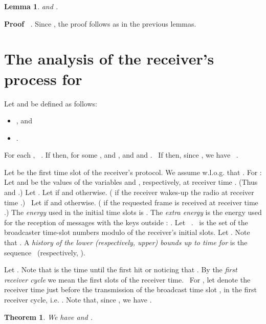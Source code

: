 \documentclass{article}
\newcommand{\tmem}[1]{{\em #1\/}}
\newcommand{\tmtextbf}[1]{{\bfseries{#1}}}
\newenvironment{itemizedot}{\begin{itemize} \renewcommand{\labelitemi}{}\renewcommand{\labelitemii}{}\renewcommand{\labelitemiii}{}\renewcommand{\labelitemiv}{}}{\end{itemize}}
\newenvironment{proof}{\noindent\textbf{Proof\ }}{\hspace*{\fill}\medskip}
\newtheorem{lemma}{Lemma}
\newtheorem{theorem}{Theorem}
\begin{document}
\begin{lemma}
  \label{union-X-Lemma} and
  .
\end{lemma}

\begin{proof}
  . Since , the
  proof follows as in the previous lemmas. 
\end{proof}

\section{\label{Section-analysis}\tmtextbf{The analysis of the receiver's
process for }}

Let  and  be defined as follows:
\begin{itemizedot}
  \item , and
  
  \item .
\end{itemizedot}
For each , \ . If  then, for some ,
 and , and  and
. \ If  then,
since , we have \ .

Let  be the first time slot of the receiver's protocol. We assume w.l.o.g.
that . For : Let  and 
be the values of the variables  and , respectively, at
receiver time . (Thus  and .) Let
. Let  if
 and  otherwise.
( if the receiver wakes-up the radio at receiver time .)
\ Let  if  and 
otherwise. ( if the requested frame is received at receiver
time .) The {\tmem{energy}} used in the initial  time slots is
. The {\tmem{extra energy}} is
the energy used for the reception of messages with the keys outside : . Let
\ . 
\ is the set of the broadcaster time-slot numbers modulo  of the receiver's
initial  slots. Let . Note that
. A {\tmem{history of the lower
(respectively, upper) bounds up to time  for }} is the
sequence \  (respectively, ).

Let . Note that  is the time until the first hit or
noticing that . By the
{\tmem{first receiver cycle}} we mean the first  slots of the receiver
time. \ For , let  denote the receiver time
just before the transmission of the broadcast time slot , in
the first receiver cycle, i.e. . Note that, since , we have
. \

\begin{theorem}
  \label{first-hit-Theorem}We have  and . \ 
\end{theorem}
\end{document}
